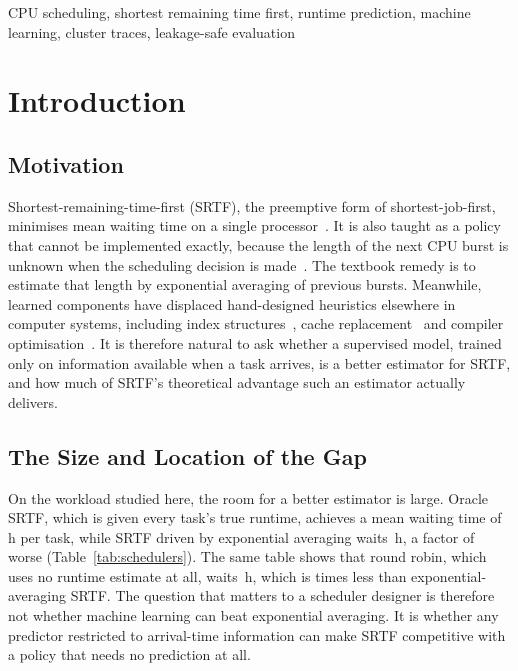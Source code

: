 \documentclass[conference]{IEEEtran}
\begin{document}
\begin{IEEEkeywords}
CPU scheduling, shortest remaining time first, runtime prediction, machine
learning, cluster traces, leakage-safe evaluation
\end{IEEEkeywords}

\section{Introduction}
\label{sec:introduction}

\subsection{Motivation}
Shortest-remaining-time-first (SRTF), the preemptive form of
shortest-job-first, minimises mean waiting time on a single
processor~\cite{schrage_optimality_1968}. It is also taught as a policy that
cannot be implemented exactly, because the length of the next CPU burst is
unknown when the scheduling decision is made~\cite{silberschatz_os_2018}.
The textbook remedy is to estimate that length by exponential averaging of
previous bursts. Meanwhile, learned components have displaced hand-designed
heuristics elsewhere in computer systems, including index
structures~\cite{kraska_case_2018}, cache
replacement~\cite{vietri_driving_2018,rodriguez_learning_2021,shi_applying_2019,song_learning_2020}
and compiler optimisation~\cite{wang_machine_2018}. It is therefore natural
to ask whether a supervised model, trained only on information available
when a task arrives, is a better estimator for SRTF, and how much of SRTF's
theoretical advantage such an estimator actually delivers.

\subsection{The Size and Location of the Gap}
On the workload studied here, the room for a better estimator is large.
Oracle SRTF, which is given every task's true runtime, achieves a mean
waiting time of \wOracle{}\,h per task, while SRTF driven by exponential
averaging waits \wExpAvg{}\,h, a factor of \ratioExpAvgOracle{} worse
(Table~\ref{tab:schedulers}). The same table shows that round robin, which
uses no runtime estimate at all, waits \wRR{}\,h, which is \ratioExpAvgRR{}
times less than exponential-averaging SRTF. The question that matters to a
scheduler designer is therefore not whether machine learning can beat
exponential averaging. It is whether any predictor restricted to
arrival-time information can make SRTF competitive with a policy that needs
no prediction at all.
\end{document}
